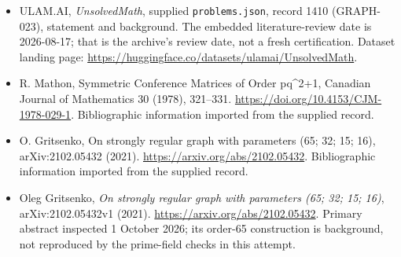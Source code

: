 \documentclass[11pt,a4paper]{article}
\begin{document}
{\small

\begin{itemize}

\item[\hypertarget{source:1410:1}{S1}] ULAM.AI, \emph{UnsolvedMath}, supplied \texttt{problems.json}, record 1410 (GRAPH-023), statement and background. The embedded literature-review date is 2026-08-17; that is the archive’s review date, not a fresh certification. Dataset landing page: \url{https://huggingface.co/datasets/ulamai/UnsolvedMath}.

\item[\hypertarget{source:1410:2}{S2}] R. Mathon, Symmetric Conference Matrices of Order pq\textasciicircum{}2+1, Canadian Journal of Mathematics 30 (1978), 321–331. \url{https://doi.org/10.4153/CJM-1978-029-1}. Bibliographic information imported from the supplied record.

\item[\hypertarget{source:1410:3}{S3}] O. Gritsenko, On strongly regular graph with parameters (65; 32; 15; 16), arXiv:2102.05432 (2021). \url{https://arxiv.org/abs/2102.05432}. Bibliographic information imported from the supplied record.


\item[E1] Oleg Gritsenko, \emph{On strongly regular graph with
parameters (65; 32; 15; 16)}, arXiv:2102.05432v1 (2021).
\url{https://arxiv.org/abs/2102.05432}. Primary abstract inspected
1 October 2026; its order-65 construction is background, not reproduced
by the prime-field checks in this attempt.

\end{itemize}

}

\label{end:1410}
\end{document}
